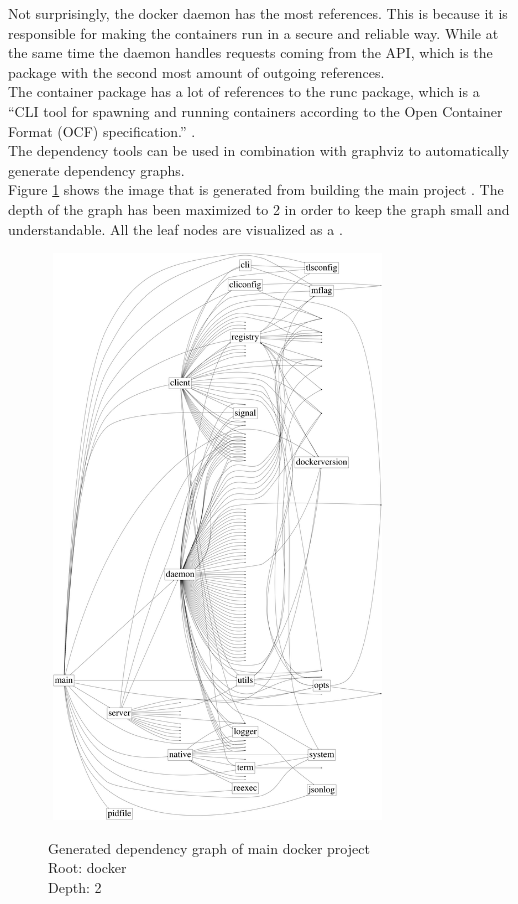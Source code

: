 Not surprisingly, the docker daemon has the most references. This is because it is responsible for making the containers run in a secure and reliable way. While at the same time the daemon handles requests coming from the API, which is the package with the second most amount of outgoing references.\\
The container package has a lot of references to the runc package, which is a ``CLI tool for spawning and running containers according to the Open Container Format (OCF) specification.'' \cite{opencontainersrunc}. \\


The dependency tools \cite{goviz} \cite{godepgraph} can be used in combination with graphviz \cite{graphviz} to automatically generate dependency graphs.\\ Figure \ref{fig:dep:dockerd2} shows the image that is generated from building the main project . The depth of the graph has been maximized to 2 in order to keep the graph small and understandable. All the leaf nodes are visualized as a .

\begin{figure}[H]
\caption{%
Generated dependency graph of main docker project\\
Root: docker\\
Depth: 2%
}
\centering
\includegraphics[width=0.8\textwidth, height=15cm]{images/dependencyGoviz/govizdockerD-2-normal-waybetter.png}
\label{fig:dep:dockerd2}
\end{figure}

